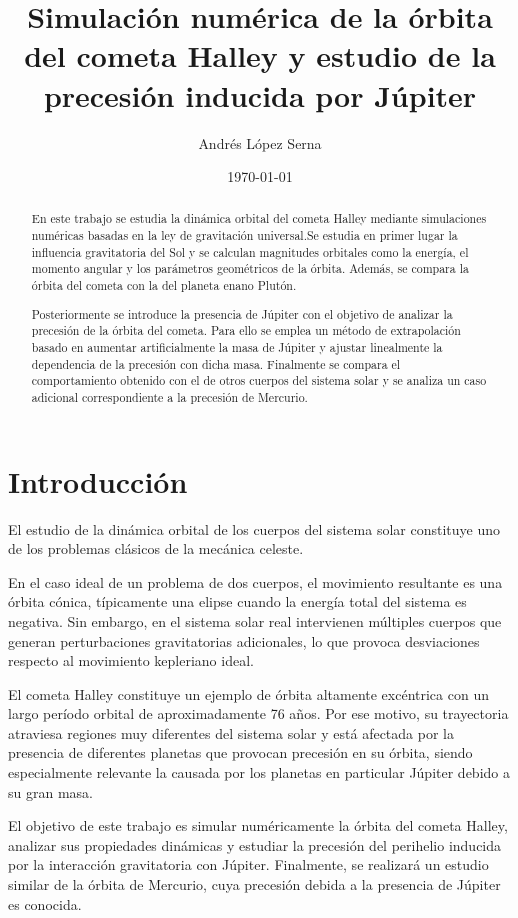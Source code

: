 \documentclass[11pt,a4paper]{article}
\title{Simulación numérica de la órbita del cometa Halley y estudio de la precesión inducida por Júpiter}
\author{Andrés López Serna}
\date{\today}
\begin{document}
\maketitle

\begin{abstract}

En este trabajo se estudia la dinámica orbital del cometa Halley mediante simulaciones numéricas basadas en la ley de gravitación universal.Se estudia en primer lugar la influencia gravitatoria del Sol y se calculan magnitudes orbitales como la energía, el momento angular y los parámetros geométricos de la órbita. Además, se compara la órbita del cometa con la del planeta enano Plutón.

Posteriormente se introduce la presencia de Júpiter con el objetivo de analizar la precesión de la órbita del cometa. Para ello se emplea un método de extrapolación basado en aumentar artificialmente la masa de Júpiter y ajustar linealmente la dependencia de la precesión con dicha masa. Finalmente se compara el comportamiento obtenido con el de otros cuerpos del sistema solar y se analiza un caso adicional correspondiente a la precesión de Mercurio.

\end{abstract}

\section{Introducción}

El estudio de la dinámica orbital de los cuerpos del sistema solar constituye uno de los problemas clásicos de la mecánica celeste. 

En el caso ideal de un problema de dos cuerpos, el movimiento resultante es una órbita cónica, típicamente una elipse cuando la energía total del sistema es negativa. Sin embargo, en el sistema solar real intervienen múltiples cuerpos que generan perturbaciones gravitatorias adicionales, lo que provoca desviaciones respecto al movimiento kepleriano ideal.

El cometa Halley constituye un ejemplo de órbita altamente excéntrica con un largo período orbital de aproximadamente 76 años. Por ese motivo, su trayectoria atraviesa regiones muy diferentes del sistema solar y está afectada por la presencia de diferentes planetas que provocan precesión en su órbita, siendo especialmente relevante la causada por los planetas en particular Júpiter debido a su gran masa.

El objetivo de este trabajo es simular numéricamente la órbita del cometa Halley, analizar sus propiedades dinámicas y estudiar la precesión del perihelio inducida por la interacción gravitatoria con Júpiter. Finalmente, se realizará un estudio similar de la órbita de Mercurio, cuya precesión debida a la presencia de Júpiter es conocida.
\end{document}
